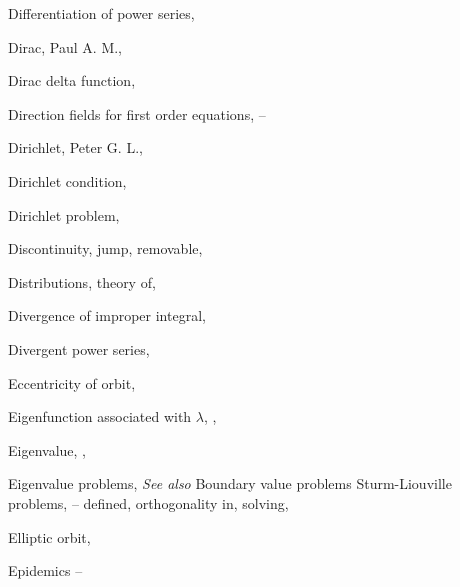 \begin{theindex}
  \item Differentiation of power series, \pageref{thmtype:7.1.4}

  \item Dirac, Paul A. M., \pageref{exer:8.6.14}

  \item Dirac delta function, \pageref{exer:8.6.14}

  \item Direction fields for first order equations, \pageref{eq:1.3.1}--\pageref{exer:1.3.24}

  \item Dirichlet, Peter G. L., \pageref{exer:12.3.2}

  \item Dirichlet condition, \pageref{exer:12.3.2}

  \item Dirichlet problem, \pageref{exer:12.3.2}

  \item Discontinuity,
    \subitem jump, \pageref{eq:8.1.12}
    \subitem removable, \pageref{eq:8.2.12}

  \item Distributions, theory of, \pageref{thmtype:8.7.1}

  \item Divergence of improper integral, \pageref{eq:8.1.1}

  \item Divergent power series, \pageref{thmtype:7.1.1} 

  \item Eccentricity of orbit, \pageref{eq:6.4.11}

  \item Eigenfunction associated with $\lambda$, \pageref{thmtype:11.1.1}, \pageref{thmtype:13.2.1}

  \item Eigenvalue, \pageref{thmtype:11.1.1}, \pageref{thmtype:13.2.1}

  \item Eigenvalue problems, \emph{See also} Boundary value problems
    \subitem Sturm-Liouville problems, \pageref{exer:13.1.32}--\pageref{exer:13.2.32}
      \subsubitem defined, \pageref{eq:13.2.10}
      \subsubitem orthogonality in, \pageref{thmtype:13.2.5}
      \subsubitem solving, \pageref{example:13.2.2}

  \item Elliptic orbit, \pageref{eq:6.4.11}

  \item Epidemics \pageref{eq:1.1.8}--\pageref{exer:2.2.29}


\end{theindex}
